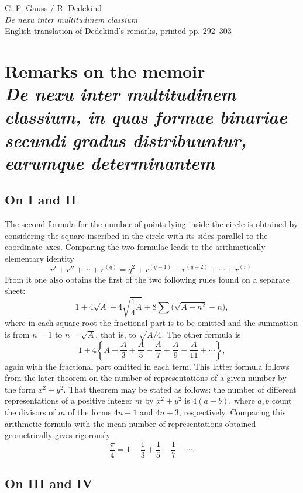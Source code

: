 \documentclass[12pt]{article}
\begin{document}
\begin{center}
{\Large C. F. Gauss / R. Dedekind}\\[3pt]
{\large \emph{De nexu inter multitudinem classium}}\\[3pt]
{\large English translation of Dedekind's remarks, printed pp. 292--303}
\end{center}

\section*{Remarks on the memoir\\
\emph{De nexu inter multitudinem classium, in quas formae binariae secundi gradus distribuuntur, earumque determinantem}}

\subsection*{On I and II}

The second formula for the number of points lying inside the circle is obtained by considering the square inscribed in the circle with its sides parallel to the coordinate axes. Comparing the two formulae leads to the arithmetically elementary identity
\[
r'+r''+\cdots+r^{(q)}=q^2+r^{(q+1)}+r^{(q+2)}+\cdots+r^{(r)}.
\]
From it one also obtains the first of the two following rules found on a separate sheet:
\[
1+4\sqrt{A}+4\sqrt{\frac14A}+8\sum\bigl(\sqrt{A-n^2}-n\bigr),
\]
where in each square root the fractional part is to be omitted and the summation is from \(n=1\) to \(n=\sqrt A\), that is, to \(\sqrt{A/4}\). The other formula is
\[
1+4\left\{A-\frac A3+\frac A5-\frac A7+\frac A9-\frac A{11}+\cdots\right\},
\]
again with the fractional part omitted in each term. This latter formula follows from the later theorem on the number of representations of a given number by the form \(x^2+y^2\). That theorem may be stated as follows: the number of different representations of a positive integer \(m\) by \(x^2+y^2\) is \(4(a-b)\), where \(a,b\) count the divisors of \(m\) of the forms \(4n+1\) and \(4n+3\), respectively. Comparing this arithmetic formula with the mean number of representations obtained geometrically gives rigorously
\[
\frac{\pi}{4}=1-\frac13+\frac15-\frac17+\cdots.
\]

\subsection*{On III and IV}
\end{document}
